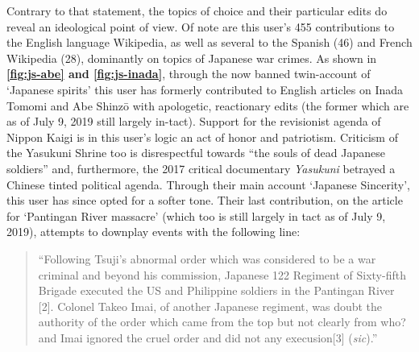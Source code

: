 \documentclass[10pt,british,A4paper,,openany]{memoir}
\begin{document}
Contrary to that statement, the topics of choice and their particular
edits do reveal an ideological point of view. Of note are this user's
455 contributions to the English language Wikipedia, as well as several
to the Spanish (46) and French Wikipedia (28), dominantly on topics of
Japanese war crimes. As shown in \textbf{\ref{fig:js-abe} and
\ref{fig:js-inada}}, through the now banned twin-account of `Japanese
spirits' this user has formerly contributed to English articles on Inada
Tomomi and Abe Shinzō with apologetic, reactionary edits (the former
which are as of July 9, 2019 still largely in-tact). Support for the
revisionist agenda of Nippon Kaigi is in this user's logic an act of
honor and patriotism. Criticism of the Yasukuni Shrine too is
disrespectful towards ``the souls of dead Japanese soldiers'' and,
furthermore, the 2017 critical documentary \emph{Yasukuni} betrayed a
Chinese tinted political agenda. Through their main account `Japanese
Sincerity', this user has since opted for a softer tone. Their last
contribution, on the article for `Pantingan River massacre' (which too
is still largely in tact as of July 9, 2019), attempts to downplay
events with the following line:

\begin{quote}
``Following Tsuji's abnormal order which was considered to be a war
criminal and beyond his commission, Japanese 122 Regiment of Sixty-fifth
Brigade executed the US and Philippine soldiers in the Pantingan River
{[}2{]}. Colonel Takeo Imai, of another Japanese regiment, was doubt the
authority of the order which came from the top but not clearly from who?
and Imai ignored the cruel order and did not any execusion{[}3{]}
(\emph{sic}).''
\end{quote}
\end{document}
